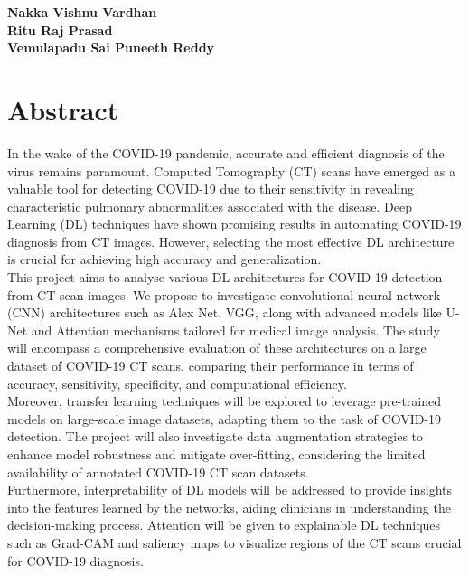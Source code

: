 \documentclass[12pt, a4paper]{report}
\begin{document}
\vspace{1cm}

\begin{flushright}
    \textbf{Nakka Vishnu Vardhan}\\
    \textbf{Ritu Raj Prasad}\\
    \textbf{Vemulapadu Sai Puneeth Reddy}
\end{flushright}


\newpage

\chapter*{Abstract}

In the wake of the COVID-19 pandemic, accurate and efficient diagnosis of the virus remains paramount. Computed Tomography (CT) scans have emerged as a valuable tool for detecting COVID-19 due to their sensitivity in revealing characteristic pulmonary abnormalities associated with the disease. Deep Learning (DL) techniques have shown promising results in automating COVID-19 diagnosis from CT images. However, selecting the most effective DL architecture is crucial for achieving high accuracy and generalization.\\

This project aims to analyse various DL architectures for COVID-19 detection from CT scan images. We propose to investigate convolutional neural network (CNN) architectures such as Alex Net, VGG, along with advanced models like U-Net and Attention mechanisms tailored for medical image analysis. The study will encompass a comprehensive evaluation of these architectures on a large dataset of COVID-19 CT scans, comparing their performance in terms of accuracy, sensitivity, specificity, and computational efficiency.\\

Moreover, transfer learning techniques will be explored to leverage pre-trained models on large-scale image datasets, adapting them to the task of COVID-19 detection. The project will also investigate data augmentation strategies to enhance model robustness and mitigate over-fitting, considering the limited availability of annotated COVID-19 CT scan datasets.\\

Furthermore, interpretability of DL models will be addressed to provide insights into the features learned by the networks, aiding clinicians in understanding the decision-making process. Attention will be given to explainable DL techniques such as Grad-CAM and saliency maps to visualize regions of the CT scans crucial for COVID-19 diagnosis.\\
\end{document}
